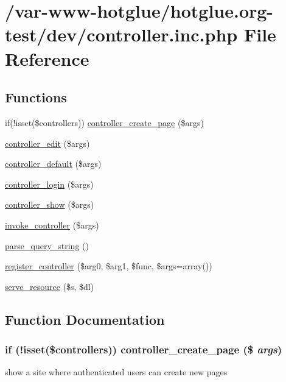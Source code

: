 \hypertarget{controller_8inc_8php}{
\section{/var-\/www-\/hotglue/hotglue.org-\/test/dev/controller.inc.php File Reference}
\label{controller_8inc_8php}
}
\subsection*{Functions}
\begin{DoxyCompactItemize}
\item 
if(!isset(\$controllers)) \hyperlink{controller_8inc_8php_a647d96ea8304771250e8fa4251a4d12e}{controller\_\-create\_\-page} (\$args)
\item 
\hyperlink{controller_8inc_8php_a406fb5b2a2a93bef89e4ba46f8829d2f}{controller\_\-edit} (\$args)
\item 
\hyperlink{controller_8inc_8php_ae9c67435a37f4b70d0769079c9dbf379}{controller\_\-default} (\$args)
\item 
\hyperlink{controller_8inc_8php_ac3e283e26869e2ffd938bdf9775c3e81}{controller\_\-login} (\$args)
\item 
\hyperlink{controller_8inc_8php_ad135971740244b9e81718d4cd0407b11}{controller\_\-show} (\$args)
\item 
\hyperlink{controller_8inc_8php_a170bef82dc4636c51b678276323e4ff4}{invoke\_\-controller} (\$args)
\item 
\hyperlink{controller_8inc_8php_a51a50fbc5165b4ff0a289b2010bb7597}{parse\_\-query\_\-string} ()
\item 
\hyperlink{controller_8inc_8php_a543961dbcd309fa2cb6a887a8666bf1c}{register\_\-controller} (\$arg0, \$arg1, \$func, \$args=array())
\item 
\hyperlink{controller_8inc_8php_a5d5274c3531eb05a1ea5927ff3cd08d3}{serve\_\-resource} (\$s, \$dl)
\end{DoxyCompactItemize}


\subsection{Function Documentation}
\hypertarget{controller_8inc_8php_a647d96ea8304771250e8fa4251a4d12e}{
\subsubsection[{controller\_\-create\_\-page}]{\setlength{\rightskip}{0pt plus 5cm}if (!isset(\$controllers)) controller\_\-create\_\-page (\$ {\em args})}}
\label{controller_8inc_8php_a647d96ea8304771250e8fa4251a4d12e}
show a site where authenticated users can create new pages 


